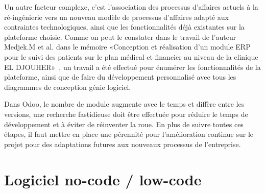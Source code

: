 Un autre facteur complexe, c'est l'association des processus d'affaires actuels à la ré-ingénierie vers un nouveau modèle de processus d'affaires adapté aux contraintes technologiques, ainsi que les fonctionnalités déjà existantes sur la plateforme choisie. Comme on peut le constater dans le travail de l'auteur Medjek.M et al. dans le mémoire «Conception et réalisation d’un module ERP pour le suivi des patients sur le plan médical et financier au niveau de la clinique EL DJOUHER»~\cite{kenza2018conception}, un travail a été effectué pour énumérer les fonctionnalités de la plateforme, ainsi que de faire du développement personnalisé avec tous les diagrammes de conception génie logiciel.

Dans Odoo, le nombre de module augmente avec le temps et diffère entre les versions, une recherche fastidieuse doit être effectuée pour réduire le temps de développement et à éviter de réinventer la roue. En plus de suivre toutes ces étapes, il faut mettre en place une pérennité pour l’amélioration continue sur le projet pour des adaptations futures aux nouveaux processus de l'entreprise.






\section{Logiciel no-code / low-code}


